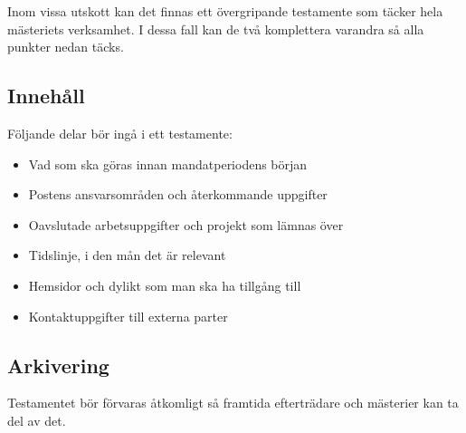 \documentclass[]{dsekprotokoll}
\begin{document}
Inom vissa utskott kan det finnas ett övergripande testamente som
täcker hela mästeriets verksamhet. I dessa fall kan de två
komplettera varandra så alla punkter nedan täcks.

\subsection{Innehåll}
Följande delar bör ingå i ett testamente:
\begin{itemize}
  \item Vad som ska göras innan mandatperiodens början
  \item Postens ansvarsområden och återkommande uppgifter
  \item Oavslutade arbetsuppgifter och projekt som lämnas över
  \item Tidslinje, i den mån det är relevant
  \item Hemsidor och dylikt som man ska ha tillgång till
  \item Kontaktuppgifter till externa parter
\end{itemize}

\subsection{Arkivering}
Testamentet bör förvaras åtkomligt så framtida efterträdare och
mästerier kan ta del av det.
\end{document}
